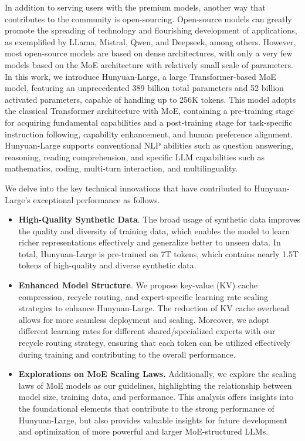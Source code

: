 \documentclass{article}
\begin{document}
In addition to serving users with the premium models, another way that contributes to the community is open-sourcing. Open-source models can greatly promote the spreading of technology and flourishing development of applications, as exemplified by LLama, Mistral, Qwen, and Deepseek, among others. However, most open-source models are based on dense architectures, with only a very few models based on the MoE architecture with relatively small scale of parameters. In this work, we introduce Hunyuan-Large, a large Transformer-based MoE model, featuring an unprecedented 389 billion total parameters and 52 billion activated parameters, capable of handling up to 256K tokens. This model adopts the classical Transformer architecture \citep{vaswani2017attention} with MoE, containing a pre-training stage for acquiring fundamental capabilities and a post-training stage for task-specific instruction following, capability enhancement, and human preference alignment.
Hunyuan-Large supports conventional NLP abilities such as question answering, reasoning, reading comprehension, and specific LLM capabilities such as mathematics, coding, multi-turn interaction, and multilinguality.

We delve into the key technical innovations that have contributed to Hunyuan-Large's exceptional performance as follows.
\begin{itemize}[leftmargin=10pt]
\item \textbf{High-Quality Synthetic Data}. The broad usage of synthetic data improves the quality and diversity of training data, which enables the model to learn richer representations effectively and generalize better to unseen data. In total, Hunyuan-Large is pre-trained on 7T tokens, which contains nearly 1.5T tokens of high-quality and diverse synthetic data.
\item \textbf{Enhanced Model Structure}. We propose key-value (KV) cache compression, recycle routing, and expert-specific learning rate scaling strategies to enhance Hunyuan-Large. The reduction of KV cache overhead allows for more seamless deployment and scaling. Moreover, we adopt different learning rates for different shared/specialized experts with our recycle routing strategy, ensuring that each token can be utilized effectively during training and contributing to the overall performance. 
\item \textbf{Explorations on MoE Scaling Laws.} Additionally, we explore the scaling laws of MoE models as our guidelines, highlighting the relationship between model size, training data, and performance. This analysis offers insights into the foundational elements that contribute to the strong performance of Hunyuan-Large, but also provides valuable insights for future development and optimization of more powerful and larger MoE-structured LLMs.
\end{itemize}
\end{document}
